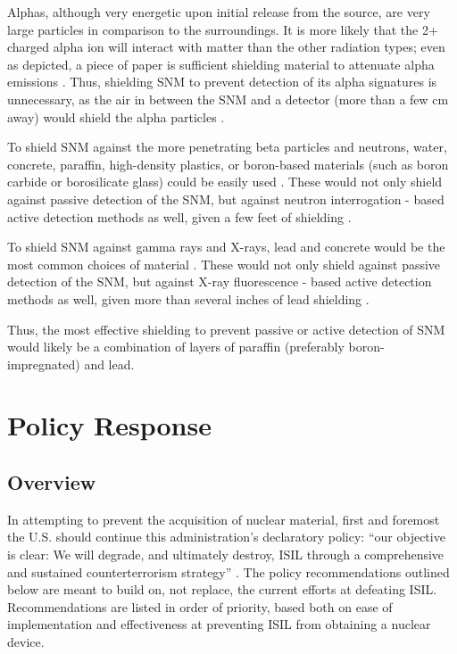 \documentclass{report}
\begin{document}
Alphas, although very energetic upon initial release from the source, are very large particles in comparison to the surroundings.  It is more likely that the 2+ charged alpha ion will interact with matter than the other radiation types; even as depicted, a piece of paper is sufficient shielding material to attenuate alpha emissions \cite{krane1987introductory}. Thus, shielding SNM to prevent detection of its alpha signatures is unnecessary, as the air in between the SNM and a detector (more than a few cm away) would shield the alpha particles \cite{Cember2008}. 

To shield SNM against the more penetrating beta particles and neutrons, water, concrete, paraffin, high-density plastics, or boron-based materials (such as boron carbide or borosilicate glass) could be easily used \cite{Cember2008}. These would not only shield against passive detection of the SNM, but against neutron interrogation - based active detection methods as well, given a few feet of shielding \cite{Grogan201362}.

To shield SNM against gamma rays and X-rays, lead and concrete would be the most common choices of material \cite{Cember2008}.  These would not only shield against passive detection of the SNM, but against X-ray fluorescence - based active detection methods as well, given more than several inches of lead shielding \cite{PhysRevC.78.041601,Grogan201362,Bertozzi2005}.

Thus, the most  effective shielding to prevent passive or active detection of SNM would likely be a combination of layers of paraffin (preferably boron-impregnated) and lead.













\chapter{Policy Response}




\section{Overview} 

In attempting to prevent the acquisition of nuclear material, first and foremost the U.S. should continue this administration's declaratory policy: \enquote{our objective is clear: We will degrade, and ultimately destroy, ISIL through a comprehensive and sustained counterterrorism strategy} \cite{Hudson2014}.  The policy recommendations outlined below are meant to build on, not replace, the current efforts at defeating ISIL. Recommendations are listed in order of priority, based both on ease of implementation and effectiveness at preventing ISIL from obtaining a nuclear device. 
\end{document}
